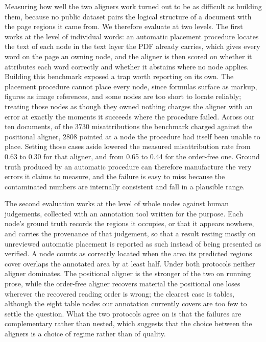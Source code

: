 \documentclass[11pt,twoside]{article}
\begin{document}
Measuring how well the two aligners work turned out to be as difficult as building them, because no public dataset pairs the logical structure of a document with the page regions it came from. We therefore evaluate at two levels. The first works at the level of individual words: an automatic placement procedure locates the text of each node in the text layer the PDF already carries, which gives every word on the page an owning node, and the aligner is then scored on whether it attributes each word correctly and whether it abstains where no node applies. Building this benchmark exposed a trap worth reporting on its own. The placement procedure cannot place every node, since formulas surface as markup, figures as image references, and some nodes are too short to locate reliably; treating those nodes as though they owned nothing charges the aligner with an error at exactly the moments it succeeds where the procedure failed. Across our ten documents, of the 3730 misattributions the benchmark charged against the positional aligner, 2808 pointed at a node the procedure had itself been unable to place. Setting those cases aside lowered the measured misattribution rate from 0.63 to 0.30 for that aligner, and from 0.65 to 0.44 for the order-free one. Ground truth produced by an automatic procedure can therefore manufacture the very errors it claims to measure, and the failure is easy to miss because the contaminated numbers are internally consistent and fall in a plausible range.

The second evaluation works at the level of whole nodes against human judgements, collected with an annotation tool written for the purpose. Each node's ground truth records the regions it occupies, or that it appears nowhere, and carries the provenance of that judgement, so that a result resting mostly on unreviewed automatic placement is reported as such instead of being presented as verified. A node counts as correctly located when the area its predicted regions cover overlaps the annotated area by at least half. Under both protocols neither aligner dominates. The positional aligner is the stronger of the two on running prose, while the order-free aligner recovers material the positional one loses wherever the recovered reading order is wrong; the clearest case is tables, although the eight table nodes our annotation currently covers are too few to settle the question. What the two protocols agree on is that the failures are complementary rather than nested, which suggests that the choice between the aligners is a choice of regime rather than of quality.
\end{document}
